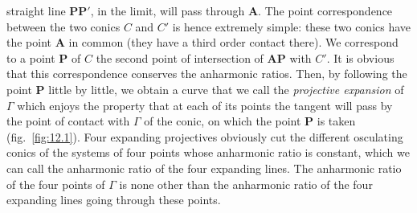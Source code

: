 \documentclass[leqno,11pt]{book}
\numberwithin{equation}{chapter}
\theoremstyle{shape1}
\theoremstyle{shapesmall}
\begin{document}
 straight line $\mathbf{PP}'$, in the limit, will pass through $\mathbf{A}$. The point correspondence between the two conics $C$ and $C'$ is hence extremely simple: these two conics have the point $\mathbf{A}$ in common (they have a third order contact there). We correspond to a point $\mathbf{P}$ of $C$ the second point of intersection of $\mathbf{AP}$ with $C'$. It is obvious that this correspondence conserves the anharmonic ratios. Then, by following the point $\mathbf{P}$ little by little, we obtain a curve that we call the \emph{projective expansion} of $\Gamma$ which enjoys the property that at each of its points the tangent will pass by the point of contact with $\Gamma$ of the conic, on which the point $\mathbf{P}$ is taken (fig.~\ref{fig:12.1}). Four expanding projectives obviously cut the different osculating conics of the systems of four points whose anharmonic ratio is constant, which we can call the anharmonic ratio of the four expanding lines. The anharmonic ratio of the four points of $\Gamma$ is none other than the anharmonic ratio of the four expanding lines going through these points.
\end{document}
